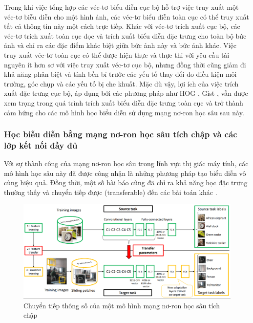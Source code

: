 Trong khi việc tổng hợp các véc-tơ biểu diễn cục bộ hỗ trợ việc truy xuất một véc-tơ biễu diễn cho một hình ảnh, các véc-tơ biểu diễn toàn cục có thể truy xuất tất cả thông tin này một cách trực tiếp. Khác với véc-tơ trích xuất cục bộ, các véc-tơ trích xuất toàn cục đọc và trích xuất biểu diễn đặc trưng cho toàn bộ bức ảnh và chỉ ra các đặc điểm khác biệt giữa bức ảnh này và bức ảnh khác. Việc truy xuất véc-tơ toàn cục có thể được hiện thực và thực thi với yêu cầu tài nguyên ít hơn sơ với việc truy xuất véc-tơ cục bộ, nhưng đồng thời cũng giảm đi khả năng phân biệt và tính bền bỉ trước các yếu tố thay đổi do điều kiện môi trường, góc chụp và các yếu tố bị che khuất. Mặc dù vậy, lợi ích của việc trích xuất đặc trưng cục bộ, áp dụng bởi các phương pháp như HOG \cite{HOG}, Gist \cite{GIST}, vẫn được xem trọng trong quá trình trích xuất biểu diễn đặc trưng toàn cục và trở thành cảm hứng cho các mô hình học biểu diễn sử dụng mạng nơ-ron học sâu sau này.

\subsubsection{Học biễu diễn bằng mạng nơ-ron học sâu tích chập và các lớp kết nối đầy đủ}

Với sự thành công của mạng nơ-ron học sâu trong lĩnh vực thị giác máy tính\cite{krizhevsky2012imagenet}, các mô hình học sâu này đã được công nhận là những phương pháp tạo biểu diễn vô cùng hiệu quả. Đồng thời, một số bài báo cũng đã chỉ ra khả năng học đặc trưng thường thấy và chuyển tiếp được (transferable) đến các bài toán khác \cite{Oquab_2014_CVPR,ZeilerVisualizingAU,Chen2018DeepLabSI}.

\begin{figure}[h]
    \centering
    \includegraphics[width=\textwidth]{pics/Chapter2/cnn_transfer.png}
    \caption{Chuyển tiếp thông số của một mô hình mạng nơ-ron học sâu tích chập\cite{Oquab_2014_CVPR}}
\end{figure}

